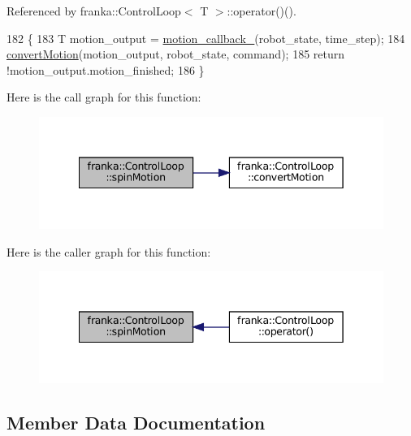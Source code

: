 Referenced by franka\+::\+Control\+Loop$<$ T $>$\+::operator()().


\begin{DoxyCode}
182                                                                                         \{
183   T motion\_output = \hyperlink{classfranka_1_1ControlLoop_a8304d484624d562c70e3572d5037871b}{motion\_callback\_}(robot\_state, time\_step);
184   \hyperlink{classfranka_1_1ControlLoop_a51052003f900ee3e99bc5409df6bbf47}{convertMotion}(motion\_output, robot\_state, command);
185   \textcolor{keywordflow}{return} !motion\_output.motion\_finished;
186 \}
\end{DoxyCode}
Here is the call graph for this function\+:
\nopagebreak
\begin{figure}[H]
\begin{center}
\leavevmode
\includegraphics[width=342pt]{classfranka_1_1ControlLoop_abec82e0ac5015ccc5fb078851ecae381_cgraph}
\end{center}
\end{figure}
Here is the caller graph for this function\+:
\nopagebreak
\begin{figure}[H]
\begin{center}
\leavevmode
\includegraphics[width=342pt]{classfranka_1_1ControlLoop_abec82e0ac5015ccc5fb078851ecae381_icgraph}
\end{center}
\end{figure}


\subsection{Member Data Documentation}
\mbox{\label{classfranka_1_1ControlLoop_a71249c690ee56b2c099bbb4f29e92c95}} 
